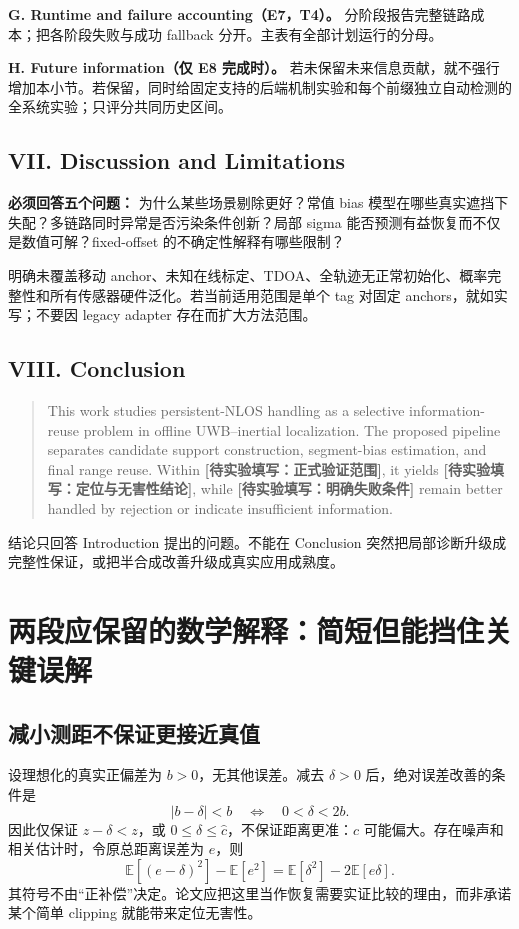 \documentclass[UTF8,fontset=fandol,11pt,a4paper]{ctexart}
\newcommand{\todo}[1]{\textbf{[待实验填写：#1]}}
\newcommand{\eng}[1]{\begin{quote}\small #1\end{quote}}
\newcommand{\E}{\mathbb{E}}
\begin{document}
\textbf{G. Runtime and failure accounting（E7，T4）。} 分阶段报告完整链路成本；把各阶段失败与成功 fallback 分开。主表有全部计划运行的分母。

\textbf{H. Future information（仅 E8 完成时）。} 若未保留未来信息贡献，就不强行增加本小节。若保留，同时给固定支持的后端机制实验和每个前缀独立自动检测的全系统实验；只评分共同历史区间。

\subsection{VII. Discussion and Limitations}

\textbf{必须回答五个问题：} 为什么某些场景剔除更好？常值 bias 模型在哪些真实遮挡下失配？多链路同时异常是否污染条件创新？局部 sigma 能否预测有益恢复而不仅是数值可解？fixed-offset 的不确定性解释有哪些限制？

明确未覆盖移动 anchor、未知在线标定、TDOA、全轨迹无正常初始化、概率完整性和所有传感器硬件泛化。若当前适用范围是单个 tag 对固定 anchors，就如实写；不要因 legacy adapter 存在而扩大方法范围。

\subsection{VIII. Conclusion}
\eng{This work studies persistent-NLOS handling as a selective information-reuse problem in offline UWB--inertial localization. The proposed pipeline separates candidate support construction, segment-bias estimation, and final range reuse. Within \todo{正式验证范围}, it yields \todo{定位与无害性结论}, while \todo{明确失败条件} remain better handled by rejection or indicate insufficient information.}

结论只回答 Introduction 提出的问题。不能在 Conclusion 突然把局部诊断升级成完整性保证，或把半合成改善升级成真实应用成熟度。

\section{两段应保留的数学解释：简短但能挡住关键误解}

\subsection{减小测距不保证更接近真值}
设理想化的真实正偏差为 \(b>0\)，无其他误差。减去 \(\delta>0\) 后，绝对误差改善的条件是
\begin{equation}
 |b-\delta|<b \quad\Longleftrightarrow\quad 0<\delta<2b.
\end{equation}
因此仅保证 \(z-\delta<z\)，或 \(0\leq\delta\leq\hat c\)，不保证距离更准：\(\hat c\) 可能偏大。存在噪声和相关估计时，令原总距离误差为 \(e\)，则
\begin{equation}
 \E[(e-\delta)^2]-\E[e^2]=\E[\delta^2]-2\E[e\delta].
\end{equation}
其符号不由“正补偿”决定。论文应把这里当作恢复需要实证比较的理由，而非承诺某个简单 clipping 就能带来定位无害性。
\end{document}
